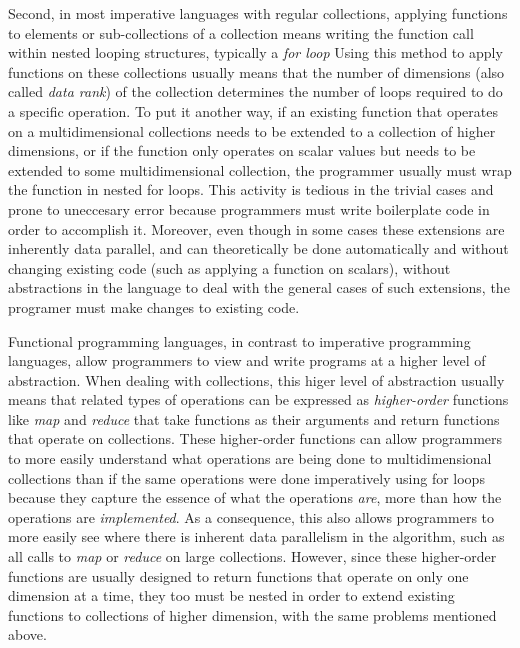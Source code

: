 Second, in most imperative languages with regular collections, applying functions to elements or sub-collections of a collection means writing the function call within nested looping structures, typically a \textit{for loop}
Using this method to apply functions on these collections usually means that the number of dimensions (also called \textit{data rank}) of the collection determines the number of loops required to do a specific operation.
To put it another way, if an existing function that operates on a multidimensional collections needs to be extended to a collection of higher dimensions, 
or if the function only operates on scalar values but needs to be extended to some multidimensional collection, 
the programmer usually must wrap the function in nested for loops.
This activity is tedious in the trivial cases and prone to uneccesary error because programmers must write boilerplate code in order to accomplish it.
Moreover, even though in some cases these extensions are inherently data parallel, and can theoretically be done automatically and without changing existing code (such as applying a function on scalars), 
without abstractions in the language to deal with the general cases of such extensions, the programer must make changes to existing code.

Functional programming languages, in contrast to imperative programming languages, allow programmers to view and write programs at a higher level of abstraction.
When dealing with collections, this higer level of abstraction usually means that related types of operations can be expressed as \textit{higher-order} functions 
like \textit{map} and \textit{reduce} that take functions as their arguments and return functions that operate on collections.
These higher-order functions can allow programmers to more easily understand what operations are being done to multidimensional collections 
than if the same operations were done imperatively using for loops 
because they capture the essence of what the operations \textit{are}, more than how the operations are \textit{implemented}.
As a consequence, this also allows programmers to more easily see where there is inherent data parallelism in the algorithm, such as all calls to \textit{map} or \textit{reduce} on large collections.
However, since these higher-order functions are usually designed to return functions that operate on only one dimension at a time, 
they too must be nested in order to extend existing functions to collections of higher dimension, with the same problems mentioned above.

